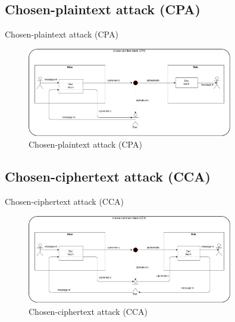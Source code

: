 \documentclass[ucs,9pt]{beamer}
\begin{document}
\subsection{Chosen-plaintext attack (CPA)}
\begin{frame}{Chosen-plaintext attack (CPA)}
    
    \begin{figure}[h]
        \centering
        \includegraphics[width=0.8\textwidth]{figures/CPA.png}
        \caption{Chosen-plaintext attack (CPA)}
    \end{figure}
\end{frame}


\subsection{Chosen-ciphertext attack (CCA)}
\begin{frame}{Chosen-ciphertext attack (CCA)}
    
    \begin{figure}[h]
        \centering
        \includegraphics[width=0.8\textwidth]{figures/CCA.png}
        \caption{Chosen-ciphertext attack (CCA)}
    \end{figure}
    
\end{frame}
\end{document}
